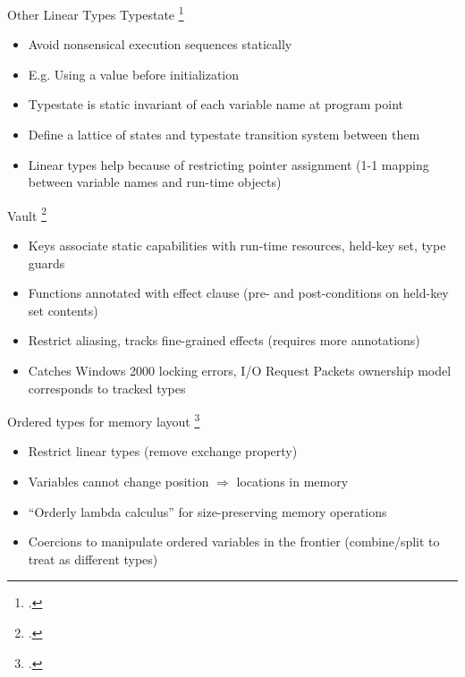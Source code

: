 \documentclass[aspectratio=169]{beamer}
\begin{document}
\begin{frame}{Other Linear Types}
  Typestate \footcite{strom_typestate:_1986}
    \begin{itemize}
        \item Avoid nonsensical execution sequences statically
        \item E.g. Using a value before initialization
        \item Typestate is static invariant of each variable name at program point %
        \item Define a lattice of states and typestate transition system between them
        \item Linear types help because of restricting pointer assignment (1-1 mapping between variable names and run-time objects)
    \end{itemize}
  Vault \footcite{deline_enforcing_2001} %
    \begin{itemize}
        \item Keys associate static capabilities with run-time resources, held-key set, type guards
        \item Functions annotated with effect clause (pre- and post-conditions on held-key set contents)
        \item Restrict aliasing, tracks fine-grained effects (requires more annotations)
        \item Catches Windows 2000 locking errors, I/O Request Packets ownership model corresponds to tracked types
    \end{itemize}
  Ordered types for memory layout \footcite{petersen_type_2003}
    \begin{itemize}
        \item Restrict linear types (remove exchange property)
        \item Variables cannot change position $\Rightarrow$ locations in memory
        \item ``Orderly lambda calculus'' for size-preserving memory operations
        \item Coercions to manipulate ordered variables in the frontier (combine/split to treat as different types)

\end{itemize}
\end{frame}
\end{document}
